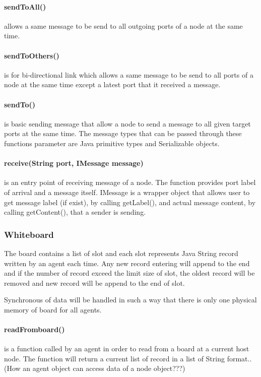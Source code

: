 \paragraph{sendToAll()} allows a same message to be send to all outgoing ports of a node at the same time.

\paragraph{sendToOthers()} is for bi-directional link which allows a same message to be send to all ports of a node at the same time except a latest port that it received a message.

\paragraph{sendTo()} is basic sending message that allow a node to send a message to all given target ports at the same time. The message types that can be passed through these functions parameter are Java primitive types and Serializable objects.

\paragraph{receive(String port, IMessage message)} is an entry point of receiving message of a node. The function provides port label of arrival and a message itself. IMessage is a wrapper object that allows user to get message label (if exist), by calling getLabel(), and actual message content, by calling getContent(), that a sender is sending.


\subsubsection*{Whiteboard}

The board contains a list of slot and each slot represents Java String record written by an agent each time. Any new record entering will append to the end and if the number of record exceed the limit size of slot, the oldest record will be removed and new record will be append to the end of slot.

Synchronous of data will be handled in such a way that there is only one physical memory of board for all agents.

\paragraph{readFromboard()} is a function called by an agent in order to read from a board at a current host node. The function will return a current list of record in a list of String format..  (How an agent object can access data of a node object???)

